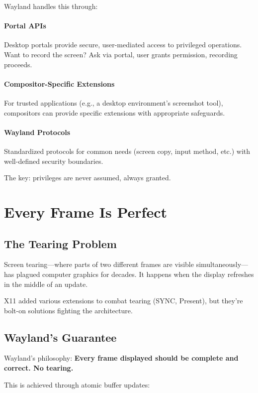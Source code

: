 Wayland handles this through:

\paragraph{Portal APIs}
Desktop portals provide secure, user-mediated access to privileged operations. Want to record the screen? Ask via portal, user grants permission, recording proceeds.

\paragraph{Compositor-Specific Extensions}
For trusted applications (e.g., a desktop environment's screenshot tool), compositors can provide specific extensions with appropriate safeguards.

\paragraph{Wayland Protocols}
Standardized protocols for common needs (screen copy, input method, etc.) with well-defined security boundaries.

The key: privileges are never assumed, always granted.

\section{Every Frame Is Perfect}

\subsection{The Tearing Problem}

Screen tearing—where parts of two different frames are visible simultaneously—has plagued computer graphics for decades. It happens when the display refreshes in the middle of an update.

X11 added various extensions to combat tearing (SYNC, Present), but they're bolt-on solutions fighting the architecture.

\subsection{Wayland's Guarantee}

Wayland's philosophy: \textbf{Every frame displayed should be complete and correct. No tearing.}

This is achieved through atomic buffer updates:

